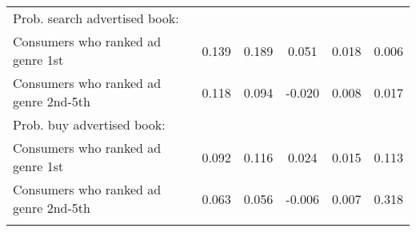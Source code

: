 \begin{center}
\begin{tabular}{lccccc}
\hspace{5pt} Prob. search advertised book: &  &  &  &  & \\
\hspace{5pt} Consumers who ranked ad genre 1st & 0.139 & 0.189 & 0.051 & 0.018 & 0.006\\
\hspace{5pt} Consumers who ranked ad genre 2nd-5th & 0.118 & 0.094 & -0.020 & 0.008 & 0.017\\
\hspace{5pt} Prob. buy advertised book: &  &  &  &  & \\
\hspace{5pt} Consumers who ranked ad genre 1st & 0.092 & 0.116 & 0.024 & 0.015 & 0.113\\
\hspace{5pt} Consumers who ranked ad genre 2nd-5th & 0.063 & 0.056 & -0.006 & 0.007 & 0.318\\
\noalign{\smallskip}\hline\end{tabular}\\
\end{center}
